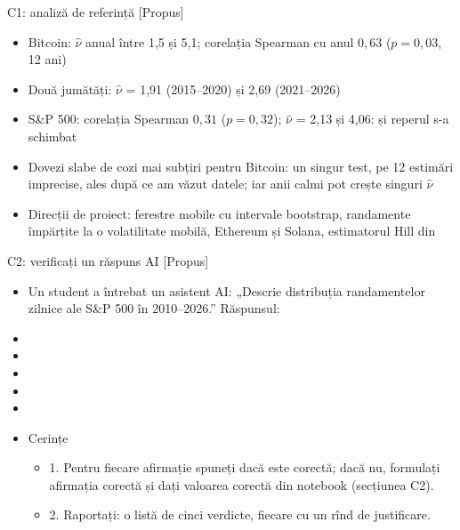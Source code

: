 \ifsolutions
\begin{frame}{C1: analiză de referință [Propus]}
\itemsize{\footnotesize}
\begin{itemize}
    \item Bitcoin: $\hat\nu$ anual între 1{,}5 și 5{,}1; corelația Spearman cu anul $0{,}63$ ($p = 0{,}03$, 12 ani)
    \item Două jumătăți: $\hat\nu$ = 1{,}91 (2015--2020) și 2{,}69 (2021--2026)
    \item S\&P 500: corelația Spearman $0{,}31$ ($p = 0{,}32$); $\hat\nu$ = 2{,}13 și 4{,}06: și reperul s-a schimbat
    \item Dovezi slabe de cozi mai subțiri pentru Bitcoin: un singur test, pe 12 estimări imprecise, ales după ce am văzut datele; iar anii calmi pot crește singuri $\hat\nu$
    \item Direcții de proiect: ferestre mobile cu intervale bootstrap, randamente împărțite la o volatilitate mobilă, Ethereum și Solana, estimatorul Hill din 
\end{itemize}
\end{frame}
\fi

\begin{frame}{C2: verificați un răspuns AI [Propus]}
\itemsize{\scriptsize}
\begin{itemize}
    \item Un student a întrebat un asistent AI: „Descrie distribuția randamentelor zilnice ale S\&P 500 în 2010--2026.” Răspunsul:
    \item {}
    \item {}
    \item {}
    \item {}
    \item {}
    \item Cerințe
    \begin{itemize}
        \item 1. Pentru fiecare afirmație spuneți dacă este corectă; dacă nu, formulați afirmația corectă și dați valoarea corectă din notebook (secțiunea C2).
        \item 2. Raportați: o listă de cinci verdicte, fiecare cu un rînd de justificare.
    \end{itemize}
\end{itemize}
\end{frame}

